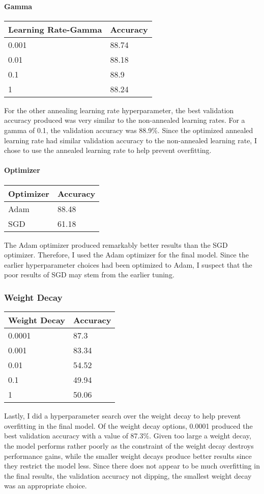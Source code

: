 \documentclass[11pt]{article}
\begin{document}
    \paragraph{Gamma}\label{gamma}

\begin{longtable}[]{@{}ll@{}}
\toprule
Learning Rate-Gamma & Accuracy\tabularnewline
\midrule
\endhead
0.001 & 88.74\tabularnewline
0.01 & 88.18\tabularnewline
0.1 & 88.9\tabularnewline
1 & 88.24\tabularnewline
\bottomrule
\end{longtable}

For the other annealing learning rate hyperparameter, the best
validation accuracy produced was very similar to the non-annealed
learning rates. For a gamma of 0.1, the validation accuracy was 88.9\%.
Since the optimized annealed learning rate had similar validation
accuracy to the non-annealed learning rate, I chose to use the annealed
learning rate to help prevent overfitting.

    \paragraph{Optimizer}\label{optimizer}

\begin{longtable}[]{@{}ll@{}}
\toprule
Optimizer & Accuracy\tabularnewline
\midrule
\endhead
Adam & 88.48\tabularnewline
SGD & 61.18\tabularnewline
\bottomrule
\end{longtable}

The Adam optimizer produced remarkably better results than the SGD
optimizer. Therefore, I used the Adam optimizer for the final model.
Since the earlier hyperparameter choices had been optimized to Adam, I
suspect that the poor results of SGD may stem from the earlier tuning.

    \subsubsection{Weight Decay}\label{weight-decay}

\begin{longtable}[]{@{}ll@{}}
\toprule
Weight Decay & Accuracy\tabularnewline
\midrule
\endhead
0.0001 & 87.3\tabularnewline
0.001 & 83.34\tabularnewline
0.01 & 54.52\tabularnewline
0.1 & 49.94\tabularnewline
1 & 50.06\tabularnewline
\bottomrule
\end{longtable}

Lastly, I did a hyperparameter search over the weight decay to help
prevent overfitting in the final model. Of the weight decay options,
0.0001 produced the best validation accuracy with a value of 87.3\%.
Given too large a weight decay, the model performs rather poorly as the
constraint of the weight decay destroys performance gains, while the
smaller weight decays produce better results since they restrict the
model less. Since there does not appear to be much overfitting in the
final results, the validation accuracy not dipping, the smallest weight
decay was an appropriate choice.
\end{document}
